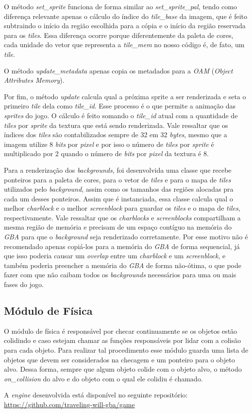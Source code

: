 O método \textit{set\_sprite} funciona de forma similar ao \textit{set\_sprite\_pal}, tendo como diferença relevante apenas o cálculo do índice do \textit{tile\_base} da imagem, que é feito subtraindo o início da região escolhida para a cópia e o início da região reservada para os \textit{tiles}. Essa diferença ocorre porque diferentemente da paleta de cores, cada unidade do vetor que representa a \textit{tile\_mem} no nosso código é, de fato, um \textit{tile}.

O método \textit{update\_metadata} apenas copia os metadados para a \textit{OAM} (\textit{Object Attributes Memory}).

Por fim, o método \textit{update} calcula qual a próxima sprite a ser renderizada e seta o primeiro \textit{tile} dela como \textit{tile\_id}. Esse processo é o que permite a animação das \textit{sprites} do jogo. O cálculo é feito somando o \textit{tile\_id} atual com a quantidade de \textit{tiles} por \textit{sprite} da textura que está sendo renderizada. Vale ressaltar que os índices dos \textit{tiles} são contabilizados sempre de 32 em 32 \textit{bytes}, mesmo que a imagem utilize 8 \textit{bits} por \textit{pixel} e por isso o número de \textit{tiles} por \textit{sprite} é multiplicado por 2 quando o número de \textit{bits} por \textit{pixel} da textura é 8.

Para a renderização dos \textit{backgrounds}, foi desenvolvida uma classe que recebe ponteiros para a paleta de cores,  para o vetor de \textit{tiles} e para o mapa de \textit{tiles} utilizados pelo \textit{background}, assim como os tamanhos das regiões alocadas pra cada um desses ponteiros. Assim que é instanciada, essa classe calcula qual o melhor \textit{charblock} e o melhor \textit{screenblock} para guardar os \textit{tiles} e o mapa de \textit{tiles}, respectivamente. Vale ressaltar que os \textit{charblocks} e \textit{screenblocks} compartilham a mesma região de memória e precisam de um espaço contíguo na memória do \textit{GBA} para que o \textit{background} seja renderizado corretamente. Por esse motivo não é recomendado apenas copiá-los para a memória do \textit{GBA} de forma sequencial, já que isso poderia causar um \textit{overlap} entre um \textit{charblock} e um \textit{screenblock}, e também poderia preencher a memória do \textit{GBA} de forma não-ótima, o que pode fazer com que não caibam todos os \textit{backgrounds} necessários para uma ou mais fases do jogo.

\subsection{Módulo de Física}

O módulo de física é responsável por checar continuamente se os objetos estão colidindo e caso estejam chamar as funções responsáveis por lidar com a colisão para cada objeto. Para realizar tal procedimento esse módulo guarda uma lista de objetos que devem ser considerados na checagem e um ponteiro para o objeto alvo. Dessa forma, sempre que algum objeto colide com o objeto alvo, o método \textit{on\_collision} do alvo e do objeto com o qual ele colidiu é chamado.


A \textit{engine} desenvolvida está disponível no seguinte repositório: \url{https://github.com/traveling-will-gba/game}
